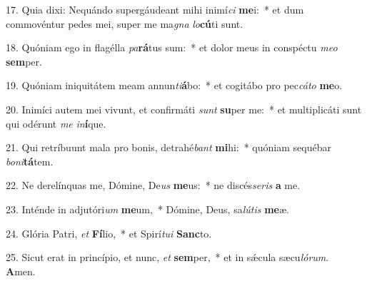 17. Quia dixi: Nequándo supergáudeant mihi inimí\textit{ci} \textbf{me}i:~*  et dum commovéntur pedes mei, super me ma\textit{gna} \textit{lo}\textbf{cú}ti sunt.\

18. Quóniam ego in flagélla \textit{pa}\textbf{rá}tus sum:~*  et dolor meus in conspéctu \textit{me}\textit{o} \textbf{sem}per.\

19. Quóniam iniquitátem meam annun\textit{ti}\textbf{á}bo:~*  et cogitábo pro pec\textit{cá}\textit{to} \textbf{me}o.\

20. Inimíci autem mei vivunt, et confirmáti \textit{sunt} \textbf{su}per me:~*  et multiplicáti sunt qui odérunt \textit{me} \textit{in}\textbf{í}que.\

21. Qui retríbuunt mala pro bonis, detrahé\textit{bant} \textbf{mi}hi:~*  quóniam sequébar \textit{bo}\textit{ni}\textbf{tá}tem.\

22. Ne derelínquas me, Dómine, De\textit{us} \textbf{me}us:~*  ne discés\textit{se}\textit{ris} \textbf{a} me.\

23. Inténde in adjutóri\textit{um} \textbf{me}um,~*  Dómine, Deus, sa\textit{lú}\textit{tis} \textbf{me}æ.\

24. Glória Patri, \textit{et} \textbf{Fí}lio,~*  et Spirí\textit{tu}\textit{i} \textbf{Sanc}to.\

25. Sicut erat in princípio, et nunc, \textit{et} \textbf{sem}per,~*  et in sǽcula sæcu\textit{ló}\textit{rum}. \textbf{A}men.\

